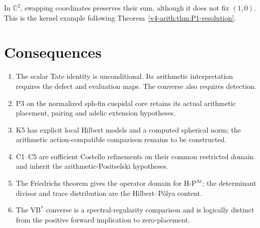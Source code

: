 In \(\mathbb C^2\), swapping coordinates preserves their sum,
although it does not fix \((1,0)\). This is the kernel
example following Theorem~\ref{v4-arith:thm:P1-resolution}.

\section{Consequences}
\label{v4-arith:w3-comparison-B:summary}

\begin{enumerate}
\item The scalar Tate identity is unconditional. Its arithmetic
interpretation requires the defect and evaluation maps. The converse
also requires detection.
\item P3 on the normalized sph-fin cuspidal core retains its actual
arithmetic placement, pairing and adelic extension hypotheses.
\item K5 has explicit local Hilbert models and a computed spherical
norm; the arithmetic action-compatible comparison remains to be constructed.
\item C1--C5 are sufficient Costello refinements on their common
restricted domain and inherit the arithmetic-Positselski hypotheses.
\item The Friedrichs theorem gives the operator domain for
\(\mathrm{H}\text{-}\mathrm{P}^{\mathrm{Ar}}\); the determinant divisor
and trace distribution are the Hilbert--P\'olya content.
\item The \(\mathrm{VB}^{*}\) converse is a spectral-regularity
comparison and is logically distinct from the positive forward
implication to zero-placement.
\end{enumerate}
